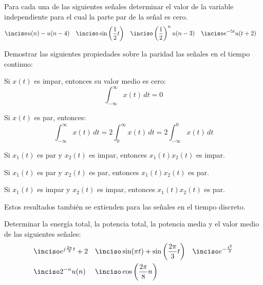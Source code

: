 \begin{ejercicio}
    Para cada una de las siguientes señales determinar el valor de la variable independiente para el cual la parte par de la señal es cero.
    \begin{align*}
        \inciso & u(n) - u(n-4) & 
        \inciso & \sin\left(\frac{1}{2}t\right) &
        \inciso & \left(\frac{1}{2}\right)^n u(n-3) &
        \inciso & e^{-5t}u(t+2)
    \end{align*}
\end{ejercicio}

\begin{ejercicio}
    Demostrar las siguientes propiedades sobre la paridad las señales en el tiempo continuo:
    
    \inciso Si $x(t)$ es impar, entonces su valor medio es cero:
    \begin{equation*}
        \int_{-\infty}^{\infty} x(t) \, dt = 0
    \end{equation*}
    
    \inciso Si $x(t)$ es par, entonces:
    \begin{equation*}
        \int_{-\infty}^{\infty} x(t) \, dt = 2 \int_{0}^{\infty} x(t) \, dt = 2 \int_{-\infty}^{0} x(t) \, dt
    \end{equation*}

    \inciso Si $x_1(t)$ es par y $x_2(t)$ es impar, entonces $x_1(t)x_2(t)$ es impar.

    \inciso Si $x_1(t)$ es par y $x_2(t)$ es par, entonces $x_1(t)x_2(t)$ es par.

    \inciso Si $x_1(t)$ es impar y $x_2(t)$ es impar, entonces $x_1(t)x_2(t)$ es par.

\vspace*{1em}

\noindent Estos resultados también se extienden para las señales en el tiempo discreto.
\end{ejercicio}


\begin{ejercicio}
    Determinar la energía total, la potencia total, la potencia media y el valor medio de las siguientes señales:
    \begin{align*}
        \inciso & e^{j\frac{2\pi}{8} t} + 2 & 
        \inciso & \sin(\pi t) + \sin\left(\frac{2\pi}{3} t\right) &
        \inciso & e^{-\frac{t^2}{2}} \\
        \inciso & 2^{-n}u(n) &
        \inciso & \cos\left(\frac{2\pi}{8} n\right)
    \end{align*}
\end{ejercicio}

